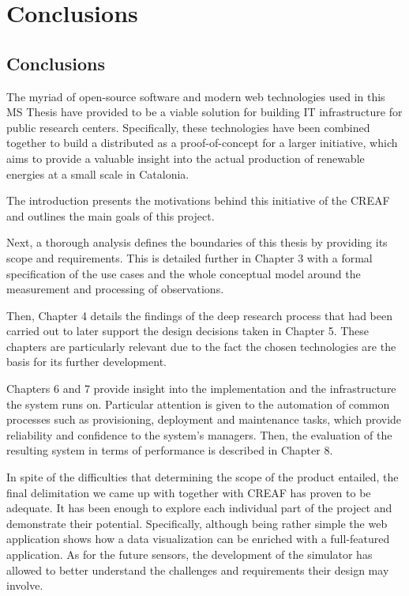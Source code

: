 \chapter{Conclusions}

\section{Conclusions}

The myriad of open-source software and modern web technologies used in this MS Thesis have provided to be a viable solution for building IT infrastructure for public research centers. Specifically, these technologies have been combined together to build a distributed as a proof-of-concept for a larger initiative, which aims to provide a valuable insight into the actual production of renewable energies at a small scale in Catalonia.

The introduction presents the motivations behind this initiative of the CREAF and outlines the main goals of this project.

Next, a thorough analysis defines the boundaries of this thesis by providing its scope and requirements. This is detailed further in Chapter 3 with a formal specification of the use cases and the whole conceptual model around the measurement and processing of observations.

Then, Chapter 4 details the findings of the deep research process that had been carried out 
to later support the design decisions taken in Chapter 5. These chapters are particularly relevant due to the fact the chosen technologies are the basis for its further development.

Chapters 6 and 7 provide insight into the implementation and the infrastructure the system runs on. Particular attention is given to the automation of common processes such as provisioning, deployment and maintenance tasks, which provide reliability and confidence to the system's managers. Then, the evaluation of the resulting system in terms of performance is described in Chapter 8.

In spite of the difficulties that determining the scope of the product entailed, the final delimitation we came up with together with CREAF has proven to be adequate. It has been enough to explore each individual part of the project and demonstrate their potential. Specifically, although being rather simple the web application shows how a data visualization can be enriched with a full-featured application. As for the future sensors, the development of the simulator has allowed to better understand the challenges and requirements their design may involve.

